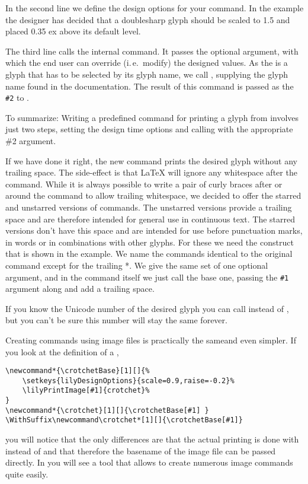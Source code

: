 \documentclass{article}
\begin{document}
In the second line we define the design options for your command.
In the example the designer has decided that a doublesharp glyph should be scaled to 1.5 and placed 0.35 ex above its default level.

The third line calls the internal  command. 
It passes the optional argument, with which the end user can override (i.\,e.\ modify) the designed values.
As the \doublesharp is a glyph that has to be selected by its glyph name, we call , supplying the glyph name found in the documentation.
The result of this command is passed as the \texttt{\#2} to .

To summarize: Writing a predefined command for printing a glyph from \emmentaler involves just two steps, setting the design time options and calling  with the appropriate \#2 argument.

\medskip
If we have done it right, the new command prints the desired glyph without any trailing space. 
The side-effect is that \LaTeX{} will ignore any whitespace after the command.
While it is always possible to write a pair of curly braces after or around the command to allow trailing whitespace, we decided to offer the starred and unstarred versions of commands.
The unstarred versions provide a trailing space and are therefore intended for general use in continuous text. 
The starred versions don't have this space and are intended for use before punctuation marks, in words or in combinations with other glyphs.
For these we need the  construct that is shown in the example.
We name the commands identical to the original command except for the trailing *.
We give the same set of one optional argument, and in the command itself we just call the base one, passing the \texttt{\#1} argument along and add a trailing space.

\medskip
If you know the Unicode number of the desired glyph you can call  instead of , but you can't be sure this number will stay the same forever.

\medskip
Creating commands using image files is practically the sameand even simpler.
If you look at the definition of a , 
\begin{verbatim}
\newcommand*{\crotchetBase}[1][]{%
    \setkeys{lilyDesignOptions}{scale=0.9,raise=-0.2}%
    \lilyPrintImage[#1]{crotchet}%
}
\newcommand*{\crotchet}[1][]{\crotchetBase[#1] }
\WithSuffix\newcommand\crotchet*[1][]{\crotchetBase[#1]}
\end{verbatim}
you will notice that the only differences are that the actual printing is done with  instead of  and that therefore the basename of the image file can be passed directly.
In  you will see a tool that allows to create numerous image commands quite easily.
\end{document}
